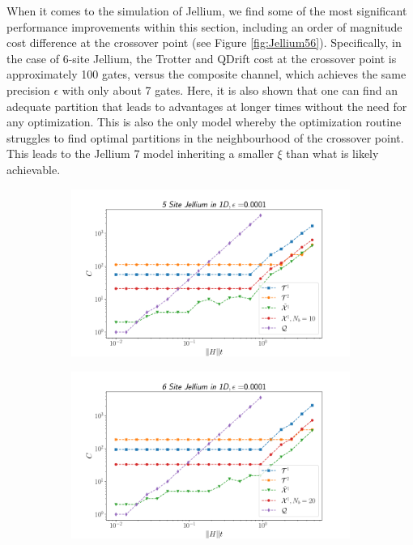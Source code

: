When it comes to the simulation of Jellium, we find some of the most significant performance improvements within this section, including an order of magnitude cost difference at the crossover point (see Figure \ref{fig:Jellium56}). Specifically, in the case of 6-site Jellium, the Trotter and QDrift cost at the crossover point is approximately 100 gates, versus the composite channel, which achieves the same precision $\epsilon$ with only about 7 gates. Here, it is also shown that one can find an adequate partition that leads to advantages at longer times without the need for any optimization. This is also the only model whereby the optimization routine struggles to find optimal partitions in the neighbourhood of the crossover point. This leads to the Jellium 7 model inheriting a smaller $\xi$ than what is likely achievable. 
\begin{figure}[h!]
    \centering
        \begin{subfigure}[b]{.49\textwidth}
            \includegraphics[width=1\textwidth]{composite_numerics/Jellium5.png}
            \caption{}
        \end{subfigure}
        \begin{subfigure}[b]{.49\textwidth}
            \includegraphics[width=1\textwidth]{composite_numerics/Jellium6.png}

\end{subfigure}
\end{figure}
